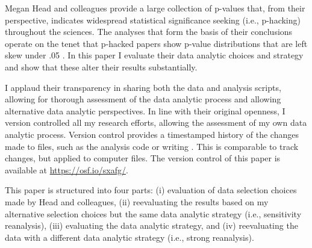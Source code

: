 Megan Head and colleagues provide a large collection of p-values that, from their perspective, indicates widespread statistical significance seeking (i.e., p-hacking) throughout the sciences. The analyses that form the basis of their conclusions operate on the tenet that p-hacked papers show p-value distributions that are left skew under .05 \cite{Simonsohn2014}. In this paper I evaluate their data analytic choices and strategy and show that these alter their results substantially. 

I applaud their transparency in sharing both the data and analysis scripts, allowing for thorough assessment of the data analytic process and allowing alternative data analytic perspectives. In line with their original openness, I version controlled all my research efforts, allowing the assessment of my own data analytic process. Version control provides a timestamped history of the changes made to files, such as the analysis code or writing \cite{Ram2013}. This is comparable to track changes, but applied to computer files. The version control of this paper is available at \href{https://osf.io/sxafg/}{https://osf.io/sxafg/}.

This paper is structured into four parts: (i) evaluation of data selection choices made by Head and colleagues, (ii) reevaluating the results based on my alternative selection choices but the same data analytic strategy (i.e., sensitivity reanalysis), (iii) evaluating the data analytic strategy, and (iv) reevaluating the data with a different data analytic strategy (i.e., strong reanalysis). 